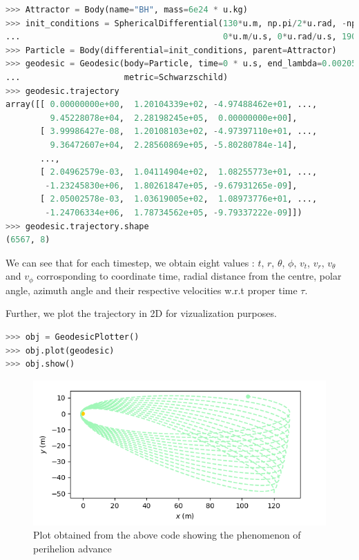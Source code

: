\documentclass{aastex63}
\begin{document}
\begin{lstlisting}[language=Python, caption=Defining the attractor and the particle and calculating geodesics]
>>> Attractor = Body(name="BH", mass=6e24 * u.kg)
>>> init_conditions = SphericalDifferential(130*u.m, np.pi/2*u.rad, -np.pi/8*u.rad,
...                                         0*u.m/u.s, 0*u.rad/u.s, 1900*u.rad/u.s)
>>> Particle = Body(differential=init_conditions, parent=Attractor)
>>> geodesic = Geodesic(body=Particle, time=0 * u.s, end_lambda=0.00205, step_size=5e-8,
...                     metric=Schwarzschild)
>>> geodesic.trajectory
array([[ 0.00000000e+00,  1.20104339e+02, -4.97488462e+01, ...,
         9.45228078e+04,  2.28198245e+05,  0.00000000e+00],
       [ 3.99986427e-08,  1.20108103e+02, -4.97397110e+01, ...,
         9.36472607e+04,  2.28560869e+05, -5.80280784e-14],
       ...,
       [ 2.04962579e-03,  1.04114904e+02,  1.08255773e+01, ...,
        -1.23245830e+06,  1.80261847e+05, -9.67931265e-09],
       [ 2.05002578e-03,  1.03619005e+02,  1.08973776e+01, ...,
        -1.24706334e+06,  1.78734562e+05, -9.79337222e-09]])
>>> geodesic.trajectory.shape
(6567, 8)
\end{lstlisting}
We can see that for each timestep, we obtain eight values : $t$, $r$, $\theta$, $\phi$, $v_t$, $v_r$, $v_\theta$ and $v_\phi$ corrosponding to coordinate time, radial distance from the centre, polar angle, azimuth angle and their respective velocities w.r.t proper time $\tau$.

Further, we plot the trajectory in 2D for vizualization purposes.
\begin{lstlisting}[language=Python, caption=Plotting the trajectory]
>>> obj = GeodesicPlotter()
>>> obj.plot(geodesic)
>>> obj.show()
\end{lstlisting}

\begin{figure}[h]
	\centering
	\includegraphics[scale=0.7]{images/perihelion_cropped.png}
	\caption{Plot obtained from the above code showing the phenomenon of perihelion advance}
	\label{fig:schwarzschild}
\end{figure}
\end{document}
